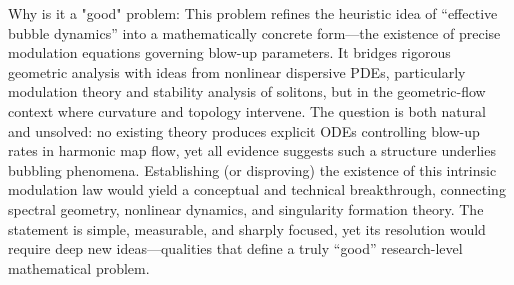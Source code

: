 Why is it a "good" problem:  
This problem refines the heuristic idea of “effective bubble dynamics” into a mathematically concrete form—the existence of precise modulation equations governing blow-up parameters. It bridges rigorous geometric analysis with ideas from nonlinear dispersive PDEs, particularly modulation theory and stability analysis of solitons, but in the geometric-flow context where curvature and topology intervene. The question is both natural and unsolved: no existing theory produces explicit ODEs controlling blow-up rates in harmonic map flow, yet all evidence suggests such a structure underlies bubbling phenomena. Establishing (or disproving) the existence of this intrinsic modulation law would yield a conceptual and technical breakthrough, connecting spectral geometry, nonlinear dynamics, and singularity formation theory. The statement is simple, measurable, and sharply focused, yet its resolution would require deep new ideas—qualities that define a truly “good” research-level mathematical problem.
